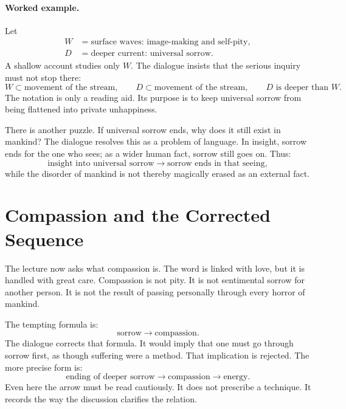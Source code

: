 \paragraph{Worked example.}
Let
\begin{align}
W &= \text{surface waves: image-making and self-pity}, \\
D &= \text{deeper current: universal sorrow}.
\end{align}
A shallow account studies only $W$. The dialogue insists that the serious inquiry must not stop there:
\begin{equation}
W \subset \text{movement of the stream},
\qquad
D \subset \text{movement of the stream},
\qquad
D \text{ is deeper than } W.
\end{equation}
The notation is only a reading aid. Its purpose is to keep universal sorrow from being flattened into private unhappiness.

There is another puzzle. If universal sorrow ends, why does it still exist in mankind? The dialogue resolves this as a problem of language. In insight, sorrow ends for the one who sees; as a wider human fact, sorrow still goes on. Thus:
\begin{equation}
\text{insight into universal sorrow}
\longrightarrow
\text{sorrow ends in that seeing},
\end{equation}
while the disorder of mankind is not thereby magically erased as an external fact.

\section{Compassion and the Corrected Sequence}

The lecture now asks what compassion is. The word is linked with love, but it is handled with great care. Compassion is not pity. It is not sentimental sorrow for another person. It is not the result of passing personally through every horror of mankind.

The tempting formula is:
\begin{equation}
\text{sorrow} \longrightarrow \text{compassion}.
\end{equation}
The dialogue corrects that formula. It would imply that one must go through sorrow first, as though suffering were a method. That implication is rejected. The more precise form is:
\begin{equation}
\text{ending of deeper sorrow}
\longrightarrow
\text{compassion}
\longrightarrow
\text{energy}.
\end{equation}
Even here the arrow must be read cautiously. It does not prescribe a technique. It records the way the discussion clarifies the relation.

